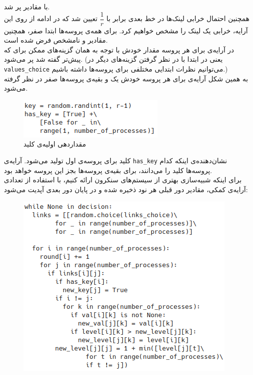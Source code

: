 \documentclass{article}
\begin{document}
\begin{multicols}{2}
با مقادیر
پر شد.\\
همچنین احتمال خرابی لینک‌ها در خط بعدی برابر با
$\dfrac{1}{r}$
تعیین شد که در ادامه از روی این آرایه، خرابی یک لینک را مشخص خواهیم کرد.
برای همه‌ی پروسه‌ها ابتدا صفر، همچنین مقادیر
و
نامشخص فرض شده است.\\
در آرایه‌ی
برای هر پروسه مقدار خودش با توجه به همان گزینه‌های ممکن برای
که پیش‌تر گفته شد پر می‌شود. (یعنی در ابتدا با در نظر گرفتن گزینه‌های دیگر در
\texttt{values\_choice}
می‌توانیم نظرات ابتدایی مختلفی برای پروسه‌ها داشته باشیم.)\\
به همین شکل آرایه‌ی
برای هر پروسه خودش یک و بقیه‌ی پروسه‌ها صفر در نظر گرفته می‌شود.
\begin{figure}[H]
    \centering
    \includegraphics[width=0.70\linewidth]{Photos/HW4/key.png}
    \caption{
    مقداردهی اولیه‌ی کلید
    }
    \label{fig:my_label}
\end{figure}
کلید برای پروسه‌ی اول تولید می‌شود. آرایه‌ی
\texttt{has\_key}
نشان‌دهنده‌ی اینکه کدام پروسه‌ها کلید را می‌دانند، برای بقیه‌ی پروسه‌ها بجز این پروسه
خواهد بود.\\
برای اینکه شبیه‌سازی بهتری از سیستم‌های سنکرون ارائه کنیم، با استفاده از تعدادی آرایه‌ی کمکی، مقادیر دور قبلی هر نود ذخیره شده و در پایان دور بعدی آپدیت می‌شود:
\begin{figure}[H]
    \centering
    \includegraphics[width=0.99\linewidth]{Photos/HW4/loop.png}

\end{figure}
\end{multicols}
\end{document}
